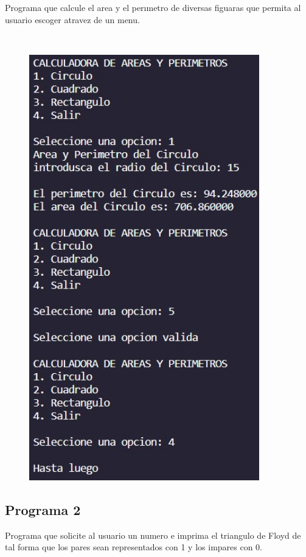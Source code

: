 \documentclass{article}
\begin{document}
Programa que calcule el area y el perımetro de diversas figuaras que permita al usuario escoger atravez de un menu.

\

\begin{figure}[H]
    \centering
    \includegraphics[width = 10cm]{img1.jpg}
\end{figure}
\newpage
\subsection{Programa 2}

Programa que solicite al usuario un numero e imprima el triangulo de Floyd de tal forma que los pares sean representados con 1 y los impares con 0.

\
\end{document}
